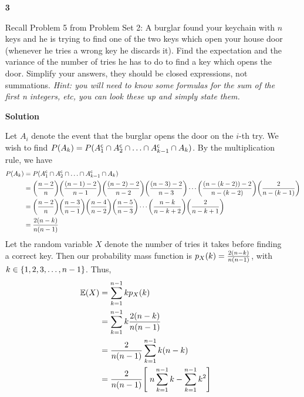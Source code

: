 \documentclass{article}
\renewcommand{\complement}{\mathsf{c}}
\DeclarePairedDelimiter{\paren}{(}{)}
\DeclarePairedDelimiter{\brac}{[}{]}
\DeclarePairedDelimiter{\set}{\{}{\}}
\newenvironment{problem}[1]    %
{
	\begin{enumerate}[leftmargin = 0in]
		\item[\bfseries{#1}]
}
{	\end{enumerate}
}
\newenvironment{solution}    %
{
	\begin{enumerate}[leftmargin = 0in]
		\item[\bfseries{Solution}]
}
{
	\end{enumerate}
}
\begin{document}
	\begin{problem}{3}
		Recall Problem 5 from Problem Set 2: A burglar found your keychain with $n$ keys and he is trying to find one of the two keys which open your house door (whenever he tries a wrong key he discards it). Find the expectation and the variance of the number of tries he has to do to find a key which opens the door. Simplify your answers, they should be closed expressions, not summations. \textit{Hint: you will need to know some formulas for the sum of the first n integers, etc, you can look these up and simply state them.}
	\end{problem}
	
	\begin{solution}
		Let $A_i$ denote the event that the burglar opens the door on the $i$-th try. We wish to find $P\paren{A_k} = P\paren{A_1^\complement \cap A_2^\complement \cap \ldots \cap A_{k-1}^\complement \cap A_k}$. By the multiplication rule, we have
		\begin{align*}
			P\paren{A_k} &= P\paren{A_1^\complement \cap A_2^\complement \cap \ldots \cap A_{k-1}^\complement \cap A_k} \\
			&= \paren[\bigg]{\frac{n - 2}{n}} \paren[\bigg]{\frac{\paren{n - 1} - 2}{n - 1}} \paren[\bigg]{\frac{\paren{n - 2} - 2}{n - 2}} \paren[\bigg]{\frac{\paren{n - 3} - 2}{n - 3}} \cdots \paren[\bigg]{\frac{\paren{n - \paren{k - 2}} - 2}{n - \paren{k - 2}}} \paren[\bigg]{\frac{2}{n - \paren{k - 1}}} \\
			&= \paren[\bigg]{\frac{n - 2}{n}} \paren[\bigg]{\frac{n - 3}{n - 1}} \paren[\bigg]{\frac{n - 4}{n - 2}} \paren[\bigg]{\frac{n - 5}{n - 3}} \cdots \paren[\bigg]{\frac{n - k }{n - k + 2}} \paren[\bigg]{\frac{2}{n - k + 1}} \\
			&= \frac{2\paren{n - k}}{n\paren{n - 1}}
		\end{align*}
		Let the random variable $X$ denote the number of tries it takes before finding a correct key. Then our probability mass function is $p_X\paren{k} = \frac{2\paren{n - k}}{n\paren{n - 1}}$, with $k \in \set{1, 2, 3, \ldots, n - 1}$. Thus,
		\begin{equation*}
			\begin{aligned}[c]
				\mathbb{E}\paren{X} &= \sum_{k = 1}^{n-1} kp_X\paren{k} \\
				&= \sum_{k = 1}^{n-1} k\frac{2\paren{n - k}}{n\paren{n - 1}} \\
				&= \frac{2}{n\paren{n - 1}} \sum_{k = 1}^{n-1} k\paren{n - k} \\
				&= \frac{2}{n\paren{n - 1}} \brac[\Bigg]{\; n\sum_{k = 1}^{n-1} k - \sum_{k = 1}^{n-1} k^2} \\

\end{aligned}
\end{equation*}
\end{solution}
\end{document}
